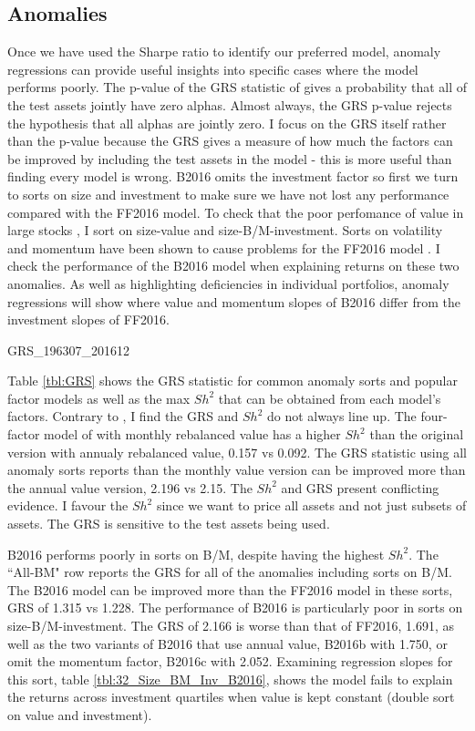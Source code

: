 
\subsection{Anomalies}

Once we have used the Sharpe ratio to identify our preferred model, anomaly regressions
can provide useful insights into specific cases where the model performs poorly. The
p-value of the GRS statistic of \textcite{gibbons1989test} gives a probability that all of
the test assets jointly have zero alphas. Almost always, the GRS p-value rejects the
hypothesis that all alphas are jointly zero. I focus on the GRS itself rather than the
p-value because the GRS gives a measure of how much the factors can be improved by
including the test assets in the model - this is more useful than finding every model is
wrong. B2016 omits the investment factor so first we turn to sorts on size and investment
to make sure we have not lost any performance compared with the FF2016 model. To check
that the poor perfomance of value in large stocks \parencite{asness2015fact}, I sort on
size-value and size-B/M-investment. Sorts on volatility \parencite{ang2006cross} and
momentum \parencite{jegadeesh1993returns} have been shown to cause problems for the FF2016
model \parencite{fama2016dissecting}. I check the performance of the B2016 model when
explaining returns on these two anomalies. As well as highlighting deficiencies in
individual portfolios, anomaly regressions will show where value and momentum slopes of
B2016 differ from the investment slopes of FF2016.

{GRS_196307_201612}

Table \ref{tbl:GRS} shows the GRS statistic for common anomaly sorts and popular factor
models as well as the max $Sh^2$ that can be obtained from each model's factors. Contrary
to \textcite{fama2016choosing}, I find the GRS and $Sh^2$ do not always line up. The four-
factor model of \textcite{carhart1997persistence} with monthly rebalanced value has a
higher $Sh^2$ than the original version with annualy rebalanced value, 0.157 vs 0.092. The
GRS statistic using all anomaly sorts reports than the monthly value version can be
improved more than the annual value version, 2.196 vs 2.15. The $Sh^2$ and GRS present
conflicting evidence. I favour the $Sh^2$ since we want to price all assets and not just
subsets of assets. The GRS is sensitive to the test assets being used.

B2016 performs poorly in sorts on B/M, despite having the highest $Sh^2$. The ``All-BM"
row reports the GRS for all of the anomalies including sorts on B/M. The B2016 model can
be improved more than the FF2016 model in these sorts, GRS of 1.315 vs 1.228. The
performance of B2016 is particularly poor in sorts on size-B/M-investment. The GRS of
2.166 is worse than that of FF2016, 1.691, as well as the two variants of B2016 that use
annual value, B2016b with 1.750, or omit the momentum factor, B2016c with 2.052. Examining
regression slopes for this sort, table \ref{tbl:32_Size_BM_Inv_B2016}, shows the model
fails to explain the returns across investment quartiles when value is kept constant
(double sort on value and investment).

